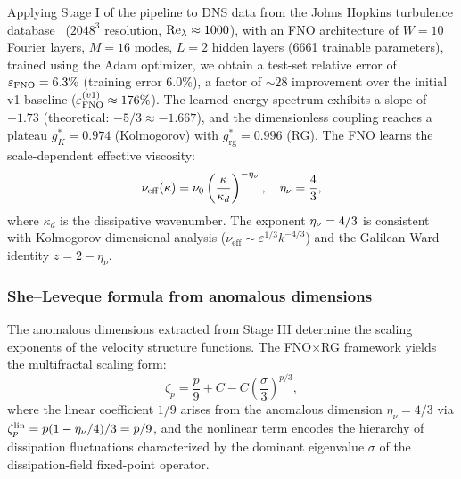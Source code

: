 Applying Stage I of the pipeline to DNS data from the Johns Hopkins turbulence database~\cite{li2008database,yeung2009lagrangian} ($2048^3$ resolution, $\mathrm{Re}_\lambda \approx 1000$), with an FNO architecture of $W{=}10$ Fourier layers, $M{=}16$ modes, $L{=}2$ hidden layers (6661 trainable parameters), trained using the Adam optimizer, we obtain a test-set relative error of $\varepsilon_{\text{FNO}}=6.3\%$ (training error $6.0\%$), a factor of ${\sim}28$ improvement over the initial v1 baseline ($\varepsilon_{\text{FNO}}^{(v1)}\approx 176\%$). The learned energy spectrum exhibits a slope of $-1.73$ (theoretical: $-5/3\approx -1.667$), and the dimensionless coupling reaches a plateau $g^*_K=0.974$ (Kolmogorov) with $g^*_{\mathrm{rg}}=0.996$ (RG). The FNO learns the scale-dependent effective viscosity:
{\small
\begin{equation} \label{eq:etanu_ns}
\nu_{\mathrm{eff}}(\kappa) = \nu_0\left(\frac{\kappa}{\kappa_d}\right)^{-\eta_\nu}, \quad \eta_\nu = \frac{4}{3},
\end{equation}
}
where $\kappa_d$ is the dissipative wavenumber. The exponent $\eta_\nu = 4/3$ is consistent with Kolmogorov dimensional analysis ($\nu_{\mathrm{eff}} \sim \varepsilon^{1/3} k^{-4/3}$) and the Galilean Ward identity $z=2-\eta_\nu$.

\subsubsection{She--Leveque formula from anomalous dimensions}

The anomalous dimensions extracted from Stage III determine the scaling exponents of the velocity structure functions. The FNO$\times$RG framework yields the multifractal scaling form:
\begin{equation}\label{eq:sl_derivation}
\zeta_p = \frac{p}{9} + C - C\!\left(\frac{\sigma}{3}\right)^{\!p/3},
\end{equation}
where the linear coefficient $1/9$ arises from the anomalous dimension $\eta_\nu = 4/3$ via $\zeta_p^{\rm lin} = p(1-\eta_\nu/4)/3 = p/9$, and the nonlinear term encodes the hierarchy of dissipation fluctuations characterized by the dominant eigenvalue $\sigma$ of the dissipation-field fixed-point operator.

